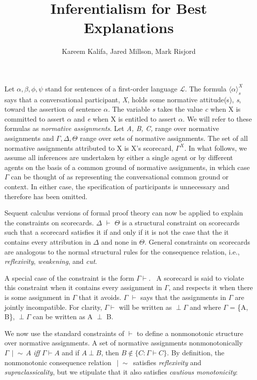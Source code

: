 \documentclass{article}
\title{Inferentialism for Best Explanations}
\author{Kareem Kalifa, Jared Millson, Mark Risjord}
\date{}
\newcommand{\nc}{\,\mid\!\sim\,}
\begin{document}
\maketitle
\setlength{\parindent}{1cm}

Let $\alpha, \beta, \phi, \psi$ stand for sentences of a first-order language $\mathcal{L}$. The formula $\langle \alpha \rangle_{s}^{X}$ says that a conversational participant, \textit{X}, holds some normative attitude(s), \textit{s}, toward the assertion of  sentence $\alpha$. The variable \textit{s} takes the value \textit{c} when X is committed to assert $\alpha$ and  \textit{e} when X is entitled to assert $\alpha$. We will refer to these formulas as \textit{normative assignments}. Let \textit{A, B, C,} range over normative assignments and $\Gamma, \Delta, \Theta$ range over sets of normative assignments. The set of all normative assignments attributed to X is X's scorecard, $\Gamma^{X}$.  In what follows, we assume all inferences are  undertaken by either a single agent or by different agents on the basis of a common ground of normative assignments, in which case $\Gamma$ can be thought of as representing the conversational common ground or context. In either case, the specification of participants is unnecessary and therefore has been omitted.

Sequent calculus versions of formal proof theory can now be applied to explain the constraints on scorecards. $\Delta$ $\vdash$ $\Theta$ is a structural constraint on scorecards such that a scorecard satisfies it if and only if it is not the case that the it contains every attribution in $\Delta$ and none in $\Theta$. General constraints on scorecards are analogous to the normal structural rules for the consequence relation, i.e., \textit{reflexivity}, \textit{weakening}, and \textit{cut}.

A special case of the constraint is the form $\Gamma\vdash$. \, A scorecard is said to violate this constraint when it contains every assignment in $\Gamma$, and respects it when there is some assignment in $\Gamma$ that it avoids. $\Gamma$ $\vdash$ says that the assignments in $\Gamma$ are jointly incompatible. For clarity, $\Gamma\vdash$ will be written as $\perp\Gamma$ and where $\Gamma$ = \{A, B\}, $\perp\Gamma$ can be written as A $\perp$ B.

We now use the standard constraints of $\vdash$ to define a nonmonotonic structure over normative assignments. A set of normative assignments nonmonotonically  $\Gamma\nc A$ \textit{iff} $\Gamma\vdash A$ and if $A \perp B$, then $ B \not\in \{C: \Gamma\vdash C\}$. By definition, the nonmonotonic consequence relation $\nc$ satisfies \textit{reflexivity} and \textit{supraclassicality}, but we stipulate that it also satisfies \textit{cautious monotonicity}:
\end{document}
